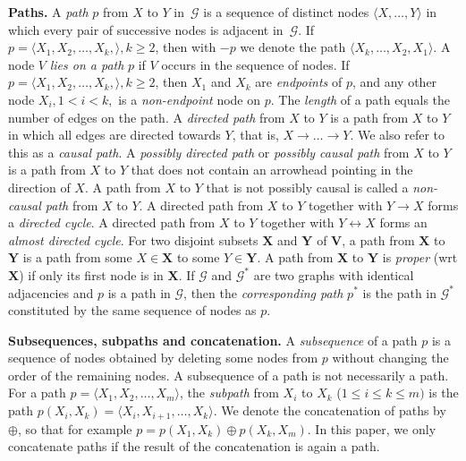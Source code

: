 \documentclass[11pt,a4paper]{article}
\newcommand{\g}[1][G]{\mathcal{#1}}
\newcommand{\pstar}[1][p]{{#1}^{*}}
\begin{document}
\textbf{Paths.} A \textit{path} $p$ from $X$ to $Y$ in~$\g$ is a sequence of distinct nodes $\langle X, \dots,Y \rangle$ in which every pair of successive nodes is adjacent in~$\g$. If $p = \langle X_1, X_2, \dots , X_k, \rangle, k \ge 2$, then with $-p$ we denote the path $\langle X_k, \dots , X_2, X_1 \rangle$. A node $V$ \emph{lies on a path} $p$ if $V$ occurs in the sequence of nodes. If $p = \langle X_1, X_2, \dots , X_k, \rangle, k \ge 2$, then $X_1$ and $X_k$ are \textit{endpoints} of $p$, and any other node $X_i, 1 <i<k,$ is a \textit{non-endpoint} node on $p$.
The \textit{length} of a path equals the number of edges on the path. A \textit{directed path} from $X$ to $Y$ is a path from $X$ to $Y$ in which all edges are directed towards $Y$, that is, $X \to \dots\to Y$. We also refer to this as a \textit{causal path}. A \textit{possibly directed path} or \textit{possibly causal path} from $X$ to $Y$ is a path from $X$ to $Y$ that does not contain an arrowhead pointing in the direction of $X$. 
A path from $X$ to $Y$ that is not possibly causal is called a \textit{non-causal path} from $X$ to $Y$. A directed path from $X$ to $Y$ together with $Y\to X$ forms a \emph{directed cycle}. A directed path from $X$ to $Y$ together with $Y\leftrightarrow X$ forms an \emph{almost directed cycle}.
For two disjoint subsets $\mathbf{X}$ and $\mathbf{Y}$ of $\mathbf{V}$, a path from $\mathbf{X}$ to $\mathbf{Y}$
is a path from some $X \in \mathbf{X}$ to some $Y \in \mathbf{Y}$.
A path from $\mathbf{X}$ to $\mathbf{Y}$ is \textit{proper} (wrt $\mathbf{X}$) if only its first node is in $\mathbf{X}$. If $\g$ and $\g^*$ are two graphs with identical adjacencies and $p$ is a path in $\g$, then the \textit{corresponding path} $\pstar$ is the path in $\g^*$ constituted by the same sequence of nodes as $p$.

\textbf{Subsequences, subpaths and concatenation.} A \textit{subsequence} of a path $p$ is a sequence of nodes obtained by deleting some nodes from $p$ without changing the order of the remaining nodes. A subsequence of a path is not necessarily a path. For a path $p = \langle X_1,X_2,\dots,X_m \rangle$, the \textit{subpath} from $X_i$ to $X_k$ ($1\le i\le k\le m)$ is the path $p(X_i,X_k) = \langle X_i,X_{i+1},\dots,X_{k}\rangle$. We denote the concatenation of paths by $\oplus$, so
that for example $p = p(X_1,X_{k}) \oplus p(X_{k},X_{m})$. In this paper, we only concatenate paths if the result of the concatenation is again a path. 
\end{document}
